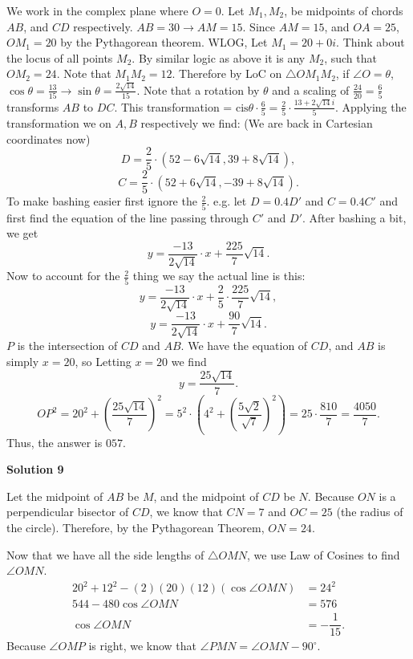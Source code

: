 \begin{enumerate}
 We work in the complex plane where \( O = 0 \). Let \( M_1, M_2 \), be midpoints of chords \( AB \), and \( CD \) respectively. \( AB=30 \rightarrow AM=15 \). Since \( AM=15 \), and \( OA=25 \), \( OM_1 = 20 \) by the Pythagorean theorem. WLOG, Let \( M_1 = 20 + 0i \).  Think about the locus of all points \( M_2 \). By similar logic as above it is any \( M_2 \), such that \( OM_2=24 \). Note that \( M_1M_2 = 12 \). Therefore by LoC on \( \triangle OM_1M_2 \), if \( \angle O = \theta \), \( \cos\theta = \frac{13}{15} \rightarrow \sin\theta = \frac{2\sqrt{14}}{15} \).  Note that a rotation by \( \theta \) and a scaling of \( \frac{24}{20} = \frac{6}{5} \) transforms \( AB \) to \( DC \).  This transformation = \( \text{cis}\theta \cdot \frac{6}{5} = \frac{2}{5} \cdot \frac{13 + 2\sqrt{14}i}{5} \).  Applying the transformation we on \( A,B \) respectively we find: (We are back in Cartesian coordinates now)  \[ D = \frac{2}{5} \cdot (52 - 6\sqrt{14}, 39 + 8\sqrt{14}), \] \[ C = \frac{2}{5} \cdot (52 + 6\sqrt{14}, -39 + 8\sqrt{14}). \]  To make bashing easier first ignore the \( \frac{2}{5} \).   e.g. let \( D = 0.4D' \) and \( C = 0.4C' \) and first find the equation of the line passing through \( C' \) and \( D' \).   After bashing a bit, we get  \[ y = \frac{-13}{2\sqrt{14}} \cdot x + \frac{225}{7}\sqrt{14}. \]  Now to account for the \( \frac{2}{5} \) thing we say the actual line is this: \[ y = \frac{-13}{2\sqrt{14}} \cdot x + \frac{2}{5} \cdot \frac{225}{7} \sqrt{14}, \] \[ y = \frac{-13}{2\sqrt{14}} \cdot x + \frac{90}{7} \sqrt{14}. \]  \( P \) is the intersection of \( CD \) and \( AB \). We have the equation of \( CD \), and \( AB \) is simply \( x = 20 \), so   Letting \( x = 20 \) we find  \[ y = \frac{25\sqrt{14}}{7}. \]   \[ OP^2 = 20^2 + \left( \frac{25\sqrt{14}}{7} \right)^2 = 5^2 \cdot \left( 4^2 + \left( \frac{5\sqrt{2}}{\sqrt{7}} \right)^2 \right) = 25 \cdot \frac{810}{7} = \frac{4050}{7}. \] Thus, the answer is \( \boxed{057} \).




\textbf{Solution 9}

Let the midpoint of $AB$ be $M$, and the midpoint of $CD$ be $N$. Because $ON$ is a perpendicular bisector of $CD$, we know that $CN=7$ and $OC=25$ (the radius of the circle). Therefore, by the Pythagorean Theorem, $ON=24$.

 Now that we have all the side lengths of $\triangle{OMN}$, we use Law of Cosines to find $\angle{OMN}$.\begin{align*}20^2+12^2-(2)(20)(12)(\cos\angle{OMN})&=24^2\\544-480\cos\angle{OMN}&=576\\\cos\angle{OMN}&=-\dfrac{1}{15}.\end{align*}
Because $\angle{OMP}$ is right, we know that $\angle{PMN}=\angle{OMN}-90^\circ$. 


\end{enumerate}
